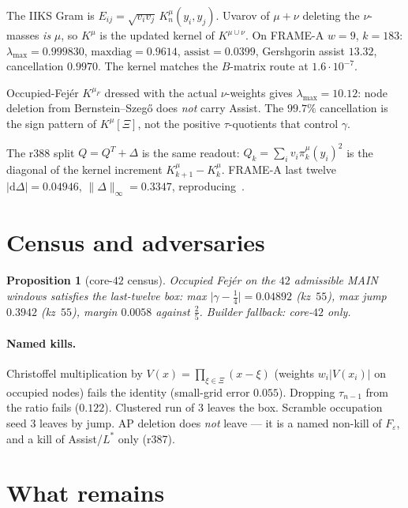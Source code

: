 \documentclass[11pt]{article}
\newtheorem{prop}{Proposition}
\theoremstyle{remark}
\newcommand{\eps}{\varepsilon}
\begin{document}
The IIKS Gram is $E_{ij}=\sqrt{v_i v_j}\,K_n^\mu(y_i,y_j)$.
Uvarov of $\mu+\nu$ deleting the $\nu$-masses \emph{is} $\mu$, so
$K^\mu$ is the updated kernel of $K^{\mu\cup\nu}$.
On FRAME-A $w=9$, $k=183$:
$\lambda_{\max}=0.999830$, $\mathrm{maxdiag}=0.9614$,
$\mathrm{assist}=0.0399$, Gershgorin assist $13.32$,
cancellation $0.9970$.
The kernel matches the $B$-matrix route at $1.6\cdot10^{-7}$.

Occupied-Fej\'er $K^{\mu_F}$ dressed with the actual $\nu$-weights
gives $\lambda_{\max}=10.12$: node deletion from Bernstein--Szeg\H{o}
does \emph{not} carry Assist.
The $99.7\%$ cancellation is the sign pattern of $K^\mu[\Xi]$, not
the positive $\tau$-quotients that control $\gamma$.

The r388 split $Q=Q^T+\Delta$ is the same readout:
$Q_k=\sum_i v_i\pi_k^\mu(y_i)^2$ is the diagonal of the kernel
increment $K_{k+1}^\mu-K_k^\mu$.
FRAME-A last twelve $\lvert\mathrm{d}\Delta\rvert=0.04946$,
$\lVert\Delta\rVert_\infty=0.3347$, reproducing~\cite{r388}.

\section{Census and adversaries}\label{sec:census}

\begin{prop}[core-$42$ census]\label{prop:census}
Occupied Fej\'er on the $42$ admissible MAIN windows satisfies
the last-twelve box: max $\lvert\gamma-\tfrac14\rvert=0.04892$
(kz~$55$), max jump $0.3942$ (kz~$55$), margin $0.0058$ against
$\tfrac25$.
Builder fallback: core-$42$ only.
\end{prop}

\paragraph{Named kills.}
Christoffel multiplication by $V(x)=\prod_{\xi\in\Xi}(x-\xi)$
(weights $w_i\lvert V(x_i)\rvert$ on occupied nodes) fails the
identity (small-grid error $0.055$).
Dropping $\tau_{n-1}$ from the ratio fails ($0.122$).
Clustered run of $3$ leaves the box.
Scramble occupation seed $3$ leaves by jump.
AP deletion does \emph{not} leave --- it is a named non-kill of
$F_\eps$, and a kill of Assist/$L^*$ only (r387).

\section{What remains}\label{sec:rest}
\end{document}
